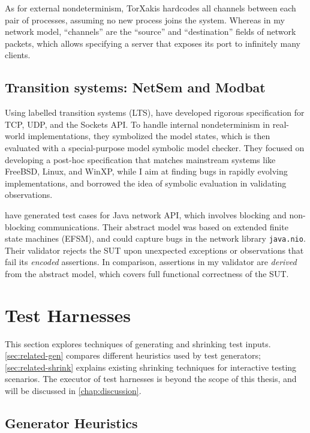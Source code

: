 As for external nondeterminism, TorXakis hardcodes all channels between each
pair of processes, assuming no new process joins the system.  Whereas in my
network model, ``channels'' are the ``source'' and ``destination'' fields of
network packets, which allows specifying a server that exposes its port to
infinitely many clients.

\subsection{Transition systems: NetSem and Modbat}
Using labelled transition systems (LTS), \citet{netsem} have developed rigorous
specification for TCP, UDP, and the Sockets API.  To handle internal
nondeterminism in real-world implementations, they symbolized the model states,
which is then evaluated with a special-purpose model symbolic model checker.
They focused on developing a post-hoc specification that matches mainstream
systems like FreeBSD, Linux, and WinXP, while I aim at finding bugs in rapidly
evolving implementations, and borrowed the idea of symbolic evaluation in
validating observations.

\citet{modbat} have generated test cases for Java network API, which involves
blocking and non-blocking communications.  Their abstract model was based on
extended finite state machines (EFSM), and could capture bugs in the network
library \verb|java.nio|.  Their validator rejects the SUT upon unexpected
exceptions or observations that fail its {\em encoded} assertions.  In
comparison, assertions in my validator are {\em derived} from the abstract
model, which covers full functional correctness of the SUT.

\section{Test Harnesses}
\label{sec:related-harness}
This section explores techniques of generating and shrinking test inputs.
\autoref{sec:related-gen} compares different heuristics used by test generators;
\autoref{sec:related-shrink} explains existing shrinking techniques for
interactive testing scenarios.  The executor of test harnesses is beyond the
scope of this thesis, and will be discussed in \autoref{chap:discussion}.

\subsection{Generator Heuristics}
\label{sec:related-gen}

